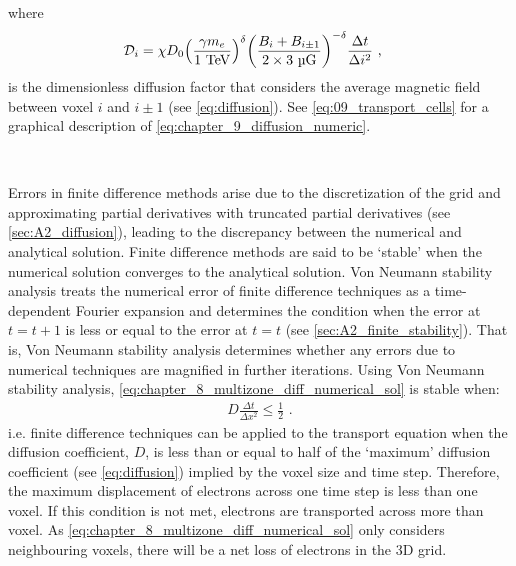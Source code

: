 \noindent where
\begin{equation}
    \begin{aligned}
    \mathcal{D}_i&=\chi D_0 \qty(\frac{\gamma m_e}{1~\TeV})^\delta \qty(\frac{B_i + B_{i\pm 1}}{2\times 3~\si{\micro G}})^{-\delta} \frac{\Delta t}{\Delta i^2}\text{ ,} 
    \end{aligned} \label{eq:chapter_9_diffusion_numeric}
\end{equation}
\noindent is the dimensionless diffusion factor that considers the average magnetic field between voxel $i$ and $i\pm 1$ (see \autoref{eq:diffusion}). See \autoref{eq:09_transport_cells} for a graphical description of \autoref{eq:chapter_9_diffusion_numeric}. 
\par~\par 
Errors in finite difference methods arise due to the discretization of the grid and approximating partial derivatives with truncated partial derivatives (see \autoref{sec:A2_diffusion}), leading to the discrepancy between the numerical and analytical solution. Finite difference methods are said to be `stable' when the numerical solution converges to the analytical solution. Von Neumann stability analysis treats the numerical error of finite difference techniques as a time-dependent Fourier expansion and determines the condition when the error at $t=t+1$ is less or equal to the error at $t=t$ (see \autoref{sec:A2_finite_stability}). That is, Von Neumann stability analysis determines whether any errors due to numerical techniques are magnified in further iterations. Using Von Neumann stability analysis, \autoref{eq:chapter_8_multizone_diff_numerical_sol} is stable when:
\begin{equation}
    \begin{aligned}
    D\frac{\Delta t}{\Delta x^2}\leq \frac{1}{2}\text{ .} 
    \end{aligned} \label{eq:09_finite_difference_diff_stable}
\end{equation}
\noindent i.e. finite difference techniques can be applied to the transport equation when the diffusion coefficient, $D$, is less than or equal to half of the `maximum' diffusion coefficient (see \autoref{eq:diffusion}) implied by the voxel size and time step. Therefore, the maximum displacement of electrons across one time step is less than one voxel. If this condition is not met, electrons are transported across more than voxel. As \autoref{eq:chapter_8_multizone_diff_numerical_sol} only considers neighbouring voxels, there will be a net loss of electrons in the 3D grid.

